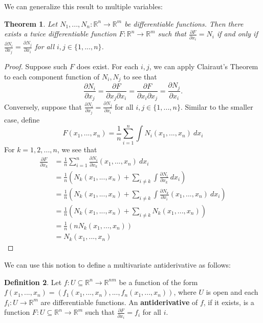 \documentclass{article}
\theoremstyle{plain} %
\newtheorem{thm}{Theorem}
\numberwithin{thm}{section} %
\theoremstyle{definition}
\newtheorem{defn}[thm]{Definition}
\begin{document}
    We can generalize this result to multiple variables:
    \begin{thm}
        Let \(N_1, ..., N_n: \mathbb{R}^n \to \mathbb{R}^m\) be differentiable functions. Then there exists a twice differentiable function \(F: \mathbb{R}^n \to \mathbb{R}^m\) such that \(\frac{\partial F}{\partial x_i} = N_i\) if and only if \(\frac{\partial N_i}{\partial x_j} = \frac{\partial N_j}{\partial x_i}\) for all \(i,j \in \{ 1, ..., n \}\).
    \end{thm}
    \begin{proof}
        Suppose such \(F\) does exist. For each \(i,j\), we can apply Clairaut's Theorem to each component function of \(N_i, N_j\) to see that
        \[
            \frac{\partial N_i}{\partial x_j} = \frac{\partial F}{\partial x_j \partial x_i} = \frac{\partial F}{\partial x_i \partial x_j} = \frac{\partial N_j}{\partial x_i}.
        \]
        Conversely, suppose that \(\frac{\partial N_i}{\partial x_j} = \frac{\partial N_j}{\partial x_i}\) for all \(i,j \in \{ 1, ..., n \}\). Similar to the smaller case, define
        \[
            F(x_1, ..., x_n) = \frac{1}{n}\sum_{i=1}^{n} \int N_i (x_1, ..., x_n)\ dx_i
        \]
        For \(k = 1,2,...,n\), we see that
        \begin{align*}
            \frac{\partial F}{\partial x_k} &= \frac{1}{n}\sum_{i=1}^{n} \frac{\partial N_i}{\partial x_k}(x_1, ..., x_n) \ dx_i \\
            &= \frac{1}{n}\left(N_k(x_1, ..., x_n) + \sum_{i\neq k} \int \frac{\partial N_i}{\partial x_k} \ dx_i \right) \\
            &=  \frac{1}{n} \left( N_k(x_1, ..., x_n) + \sum_{i\neq k} \int \frac{\partial N_k}{\partial x_i} (x_1, ..., x_n)\ dx_i \right) \\
            &= \frac{1}{n} \left( N_k(x_1, ..., x_n) + \sum_{i\neq k} N_k(x_1, ..., x_n) \right) \\
            &= \frac{1}{n}\left( n N_k(x_1, ..., x_n) \right) \\
            &= N_k(x_1, ..., x_n)
        \end{align*}
    \end{proof}
    We can use this notion to define a multivariate antiderivative as follows:
    \begin{defn}
        Let \(f: U \subseteq \mathbb{R}^n \to \mathbb{R}^{nm}\) be a function of the form \(f(x_1, ..., x_n) = (f_1(x_1, ..., x_n), ..., f_n(x_1, ..., x_n))\), where \(U\) is open and each \(f_i: U \to \mathbb{R}^m\) are differentiable functions. An \textbf{antiderivative} of \(f\), if it exists, is a function \(F: U \subseteq \mathbb{R}^n \to \mathbb{R}^m\) such that \(\frac{\partial F}{\partial x_i} = f_i\) for all \(i\).
    \end{defn}
\end{document}
